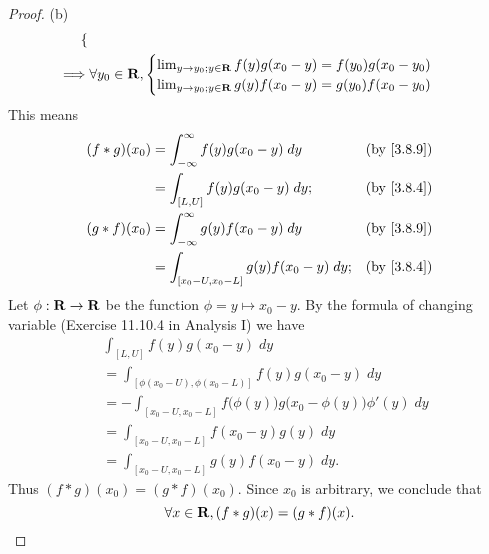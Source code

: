 \begin{proof}{(b)}
\begin{align*}
\begin{cases}
                                   \end{cases}             \\
    \implies & \forall y_0 \in \mathbf{R}, \begin{cases}
                                     \lim_{y \to y_0 ; y \in \mathbf{R}} f(y) g(x_0 - y) = f(y_0) g(x_0 - y_0) \\
                                     \lim_{y \to y_0 ; y \in \mathbf{R}} g(y) f(x_0 - y) = g(y_0) f(x_0 - y_0)
                                   \end{cases}
  \end{align*}
  This means
  \begin{align*}
    (f * g)(x_0) & = \int_{-\infty}^\infty f(y) g(x_0 - y) \; dy      & \text{(by \cref{3.8.9})} \\
                 & = \int_{[L, U]} f(y) g(x_0 - y) \; dy;             & \text{(by \cref{3.8.4})} \\
    (g * f)(x_0) & = \int_{-\infty}^\infty g(y) f(x_0 - y) \; dy      & \text{(by \cref{3.8.9})} \\
                 & = \int_{[x_0 - U, x_0 - L]} g(y) f(x_0 - y) \; dy; & \text{(by \cref{3.8.4})}
  \end{align*}
  Let \(\phi : \mathbf{R} \to \mathbf{R}\) be the function \(\phi = y \mapsto x_0 - y\).
  By the formula of changing variable (Exercise 11.10.4 in Analysis I) we have
  \begin{align*}
     & \int_{[L, U]} f(y) g(x_0 - y) \; dy                                                     \\
     & = \int_{[\phi(x_0 - U), \phi(x_0 - L)]} f(y) g(x_0 - y) \; dy                           \\
     & = -\int_{[x_0 - U, x_0 - L]} f\big(\phi(y)\big) g\big(x_0 - \phi(y)\big) \phi'(y) \; dy \\
     & = \int_{[x_0 - U, x_0 - L]} f(x_0 - y) g(y) \; dy                                       \\
     & = \int_{[x_0 - U, x_0 - L]} g(y) f(x_0 - y) \; dy.
  \end{align*}
  Thus \((f * g)(x_0) = (g * f)(x_0)\).
  Since \(x_0\) is arbitrary, we conclude that
  \[
    \forall x \in \mathbf{R}, (f * g)(x) = (g * f)(x).
  \]
\end{proof}

